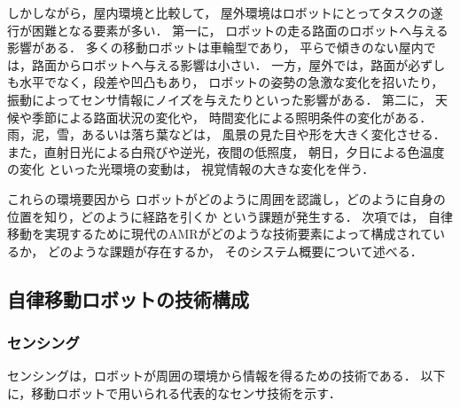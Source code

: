 しかしながら，屋内環境と比較して，
屋外環境はロボットにとってタスクの遂行が困難となる要素が多い．
第一に，
ロボットの走る路面のロボットへ与える影響がある．
多くの移動ロボットは車輪型\cite{原2025}であり，
平らで傾きのない屋内では，路面からロボットへ与える影響は小さい．
一方，屋外では，路面が必ずしも水平でなく，段差や凹凸もあり，
ロボットの姿勢の急激な変化を招いたり，
振動によってセンサ情報にノイズを与えたりといった影響がある．
第二に，
天候や季節による路面状況の変化や，
時間変化による照明条件の変化がある．
雨，泥，雪，あるいは落ち葉などは，
風景の見た目や形を大きく変化させる．
また，直射日光による白飛びや逆光，夜間の低照度，
朝日，夕日による色温度の変化
といった光環境の変動は，
視覚情報の大きな変化を伴う．

これらの環境要因から
ロボットがどのように周囲を認識し，どのように自身の位置を知り，どのように経路を引くか
という課題が発生する．
次項では，
自律移動を実現するために現代のAMRがどのような技術要素によって構成されているか，
どのような課題が存在するか，
そのシステム概要について述べる．


\subsection{自律移動ロボットの技術構成}

\subsubsection{センシング}
センシングは，ロボットが周囲の環境から情報を得るための技術である．
以下に，移動ロボットで用いられる代表的なセンサ技術を示す．

